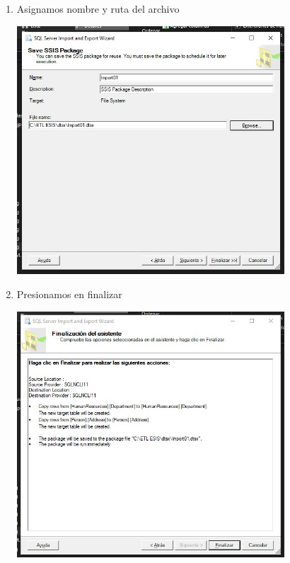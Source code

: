 \begin{enumerate}
     \item Asignamos nombre y ruta del archivo
        \begin{center}
             \includegraphics[width=10cm]{imagenes/importa_data_7.jpg}
        \end{center}
        
     \item Presionamos en finalizar
        \begin{center}
             \includegraphics[width=10cm]{imagenes/importa_data_8.jpg}
        \end{center}
        \newpage
                

\end{enumerate}

